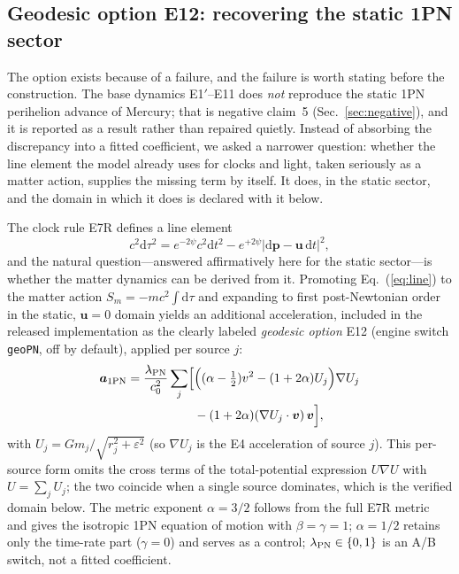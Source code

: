 \documentclass[aps,reprint,amsmath,amssymb,nofootinbib,superscriptaddress,floatfix]{revtex4-2}
\newcommand{\ud}{\mathrm{d}}
\newcommand{\vect}[1]{\bm{#1}}
\begin{document}
\subsection{Geodesic option E12: recovering the static 1PN sector}
\label{sec:e12}

The option exists because of a failure, and the failure is worth
stating before the construction.
The base dynamics E1$'$--E11 does \emph{not} reproduce the static 1PN
perihelion advance of Mercury; that is negative claim~5
(Sec.~\ref{sec:negative}), and it is reported as a result rather than
repaired quietly.
Instead of absorbing the discrepancy into a fitted coefficient, we
asked a narrower question: whether the line element the model already
uses for clocks and light, taken seriously as a matter action, supplies
the missing term by itself.
It does, in the static sector, and the domain in which it does is
declared with it below.

The clock rule E7R defines a line element
\begin{equation}
c^2\ud\tau^2 = e^{-2\psi}c^2\ud t^2
 - e^{+2\psi}\left|\ud\vect{p}-\vect{u}\,\ud t\right|^2 ,
\label{eq:line}
\end{equation}
and the natural question---answered affirmatively here for the static
sector---is whether the matter dynamics can be derived from it.
Promoting Eq.~(\ref{eq:line}) to the matter action
$S_m = -mc^2\!\int\!\ud\tau$ and expanding to first post-Newtonian
order in the static, $\vect{u} = 0$ domain yields an additional
acceleration, included in the released implementation as the clearly
labeled \emph{geodesic option} E12 (engine switch \texttt{geoPN}, off
by default), applied per source $j$:
\begin{equation}
\begin{split}
\vect{a}_{\rm 1PN} = \frac{\lambda_{\rm PN}}{c_0^2}\sum_j
 \Bigl[&\Bigl((\alpha-\tfrac12)v^2 - (1+2\alpha)U_j\Bigr)\nabla U_j\\
 &{}- (1+2\alpha)(\nabla U_j\cdot\vect{v})\,\vect{v}\Bigr],
\end{split}
\label{eq:e12}
\end{equation}
with $U_j = Gm_j/\sqrt{r_j^2+\varepsilon^2}$ (so $\nabla U_j$ is the
E4 acceleration of source $j$).
This per-source form omits the cross terms of the total-potential
expression $U\nabla U$ with $U = \sum_j U_j$; the two coincide when a
single source dominates, which is the verified domain below.
The metric exponent $\alpha = 3/2$ follows from the full E7R metric
and gives the isotropic 1PN equation of motion with
$\beta = \gamma = 1$; $\alpha = 1/2$ retains only the time-rate part
($\gamma = 0$) and serves as a control; $\lambda_{\rm PN} \in \{0,1\}$
is an A/B switch, not a fitted coefficient.
\end{document}
